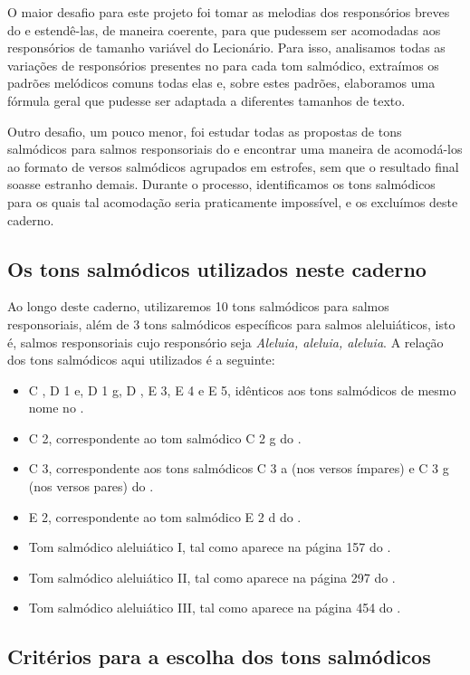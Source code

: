 O maior desafio para este projeto foi tomar as melodias dos responsórios breves do {\GS} e estendê-las, de maneira coerente, para que pudessem ser acomodadas aos responsórios de tamanho variável do Lecionário. Para isso, analisamos todas as variações de responsórios presentes no {\GS} para cada tom salmódico, extraímos os padrões melódicos comuns todas elas e, sobre estes padrões, elaboramos uma fórmula geral que pudesse ser adaptada a diferentes tamanhos de texto.

Outro desafio, um pouco menor, foi estudar todas as propostas de tons salmódicos para salmos responsoriais do {\GS} e encontrar uma maneira de acomodá-los ao formato de versos salmódicos agrupados em estrofes, sem que o resultado final soasse estranho demais. Durante o processo, identificamos os tons salmódicos para os quais tal acomodação seria praticamente impossível, e os excluímos deste caderno.

\subsection{Os tons salmódicos utilizados neste caderno}

Ao longo deste caderno, utilizaremos 10 tons salmódicos para salmos responsoriais, além de 3 tons salmódicos específicos para salmos aleluiáticos, isto é, salmos responsoriais cujo responsório seja \emph{Aleluia, aleluia, aleluia}. A relação dos tons salmódicos aqui utilizados é a seguinte:
\begin{itemize}
  \item C \protect\GreStar, D 1 e, D 1 g, D \protect\GreStar, E 3, E 4 e E 5, idênticos aos tons salmódicos de mesmo nome no {\GS}.
  \item C 2, correspondente ao tom salmódico C 2 g do {\GS}.
  \item C 3, correspondente aos tons salmódicos C 3 a (nos versos ímpares) e C 3 g (nos versos pares) do {\GS}.
  \item E 2, correspondente ao tom salmódico E 2 d do {\GS}.
  \item Tom salmódico aleluiático I, tal como aparece na página 157 do {\GS}.
  \item Tom salmódico aleluiático II, tal como aparece na página 297 do {\GS}.
  \item Tom salmódico aleluiático III, tal como aparece na página 454 do {\GS}.
\end{itemize}

\subsection{Critérios para a escolha dos tons salmódicos}


